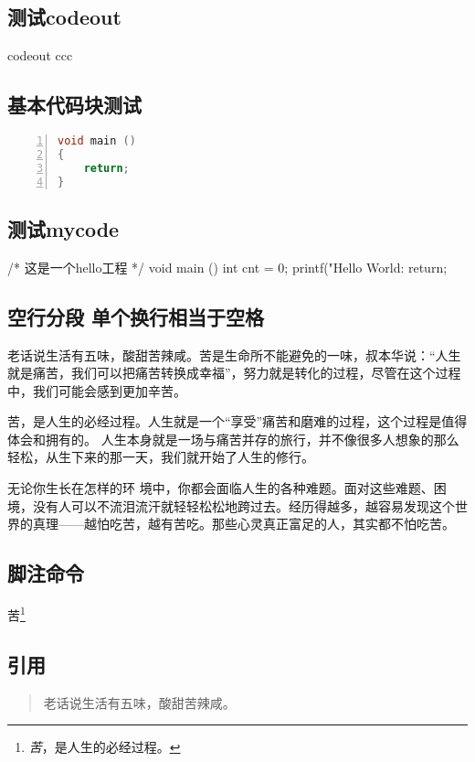 \subsection{测试codeout}
\begin{codeout}
codeout ccc
\end{codeout}


\subsection{基本代码块测试}
\begin{lstlisting}[language=C, numbers=left]
void main ()
{
    return;
}
\end{lstlisting}

\subsection{测试mycode}
\begin{myccode}[caption={hello工程}]
/* 这是一个hello工程 */
void main ()
{
    int cnt = 0;
    printf("Hello World: %
    return;
}
\end{myccode}

\subsection{空行分段 单个换行相当于空格}
老话说生活有五味，酸甜苦辣咸。苦是生命所不能避免的一味，叔本华说：“人生就是痛苦，我们可以把痛苦转换成幸福”，努力就是转化的过程，尽管在这个过程中，我们可能会感到更加辛苦。

苦，是人生的必经过程。人生就是一个“享受”痛苦和磨难的过程，这个过程是值得体会和拥有的。
人生本身就是一场与痛苦并存的旅行，并不像很多人想象的那么轻松，从生下来的那一天，我们就开始了人生的修行。

无论你生长在怎样的环
境中，你都会面临人生的各种难题。面对这些难题、困境，没有人可以不流泪流汗就轻轻松松地跨过去。经历得越多，越容易发现这个世界的真理——越怕吃苦，越有苦吃。那些心灵真正富足的人，其实都不怕吃苦。

\subsection{脚注命令}
苦\footnote{\emph 苦，是人生的必经过程。}

\subsection{引用}
\begin{quote}
老话说生活有五味，酸甜苦辣咸。
\end{quote}

